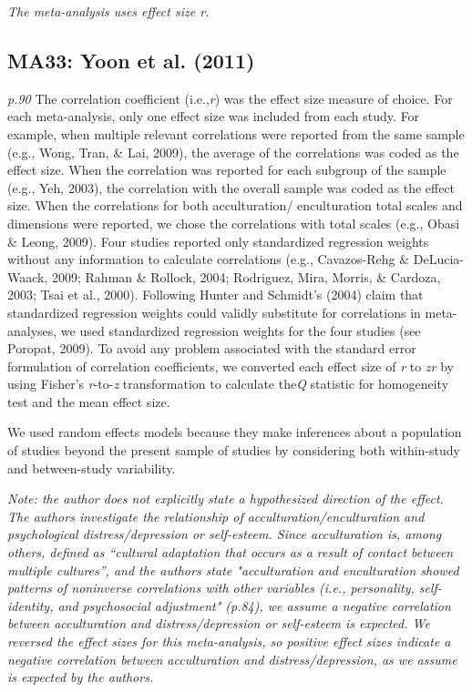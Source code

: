\documentclass{article}
\begin{document}
\vspace{3mm}
\textit{The meta-analysis uses effect size r.}

\subsection*{MA33: Yoon et al. (2011)}

\textit{p.90} The correlation coefficient (i.e.,\textit{r}) was the effect size measure of choice. For each meta-analysis, only one effect size was included from each study. For example, when multiple relevant correlations were reported from the same sample (e.g., Wong, Tran, \& Lai, 2009), the average of the correlations was coded as the effect size. When the correlation was reported for each subgroup of the sample (e.g., Yeh, 2003), the correlation with the overall sample was coded as the effect size. When the correlations for both acculturation/ enculturation total scales and dimensions were reported, we chose the correlations with total scales (e.g., Obasi \& Leong, 2009). Four studies reported only standardized regression weights without any information to calculate correlations (e.g., Cavazos-Rehg \& DeLucia-Waack, 2009; Rahman \& Rollock, 2004; Rodriguez, Mira, Morris, \& Cardoza, 2003; Tsai et al., 2000). Following Hunter and Schmidt’s (2004) claim that standardized regression weights could validly substitute for correlations in meta-analyses, we used standardized regression weights for the four studies (see Poropat, 2009). To avoid any problem associated with the standard error formulation of correlation coefficients, we converted each effect size of \textit{r} to \textit{zr} by using Fisher’s \textit{r}-to-\textit{z} transformation to calculate the\textit{Q} statistic for homogeneity test and the mean effect size.

We used random effects models because they make inferences about a population of studies beyond the present sample of studies by considering both within-study and between-study variability.

\vspace{3 mm}
\textit{Note: the author does not explicitly state a hypothesized direction of the effect. The authors investigate the relationship of acculturation/enculturation and psychological distress/depression or self-esteem. Since acculturation is, among others, defined as “cultural adaptation that occurs as a result of contact between multiple cultures”, and the authors state "acculturation and enculturation showed patterns of noninverse correlations with other variables (i.e., personality, self-identity, and psychosocial adjustment" (p.84), we assume a negative correlation between acculturation and distress/depression or self-esteem is expected. We reversed the effect sizes for this meta-analysis, so positive effect sizes indicate a negative correlation between acculturation and distress/depression, as we assume is expected by the authors. }
\end{document}
